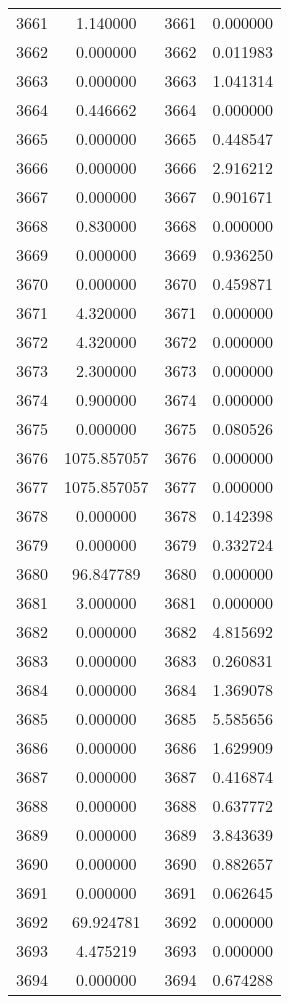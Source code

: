 \documentclass[12pt]{article}
\begin{document}
\begin{longtable}{@{}cccc@{}}
3661 & 1.140000 & 3661 & 0.000000 \\
3662 & 0.000000 & 3662 & 0.011983 \\
3663 & 0.000000 & 3663 & 1.041314 \\
3664 & 0.446662 & 3664 & 0.000000 \\
3665 & 0.000000 & 3665 & 0.448547 \\
3666 & 0.000000 & 3666 & 2.916212 \\
3667 & 0.000000 & 3667 & 0.901671 \\
3668 & 0.830000 & 3668 & 0.000000 \\
3669 & 0.000000 & 3669 & 0.936250 \\
3670 & 0.000000 & 3670 & 0.459871 \\
3671 & 4.320000 & 3671 & 0.000000 \\
3672 & 4.320000 & 3672 & 0.000000 \\
3673 & 2.300000 & 3673 & 0.000000 \\
3674 & 0.900000 & 3674 & 0.000000 \\
3675 & 0.000000 & 3675 & 0.080526 \\
3676 & 1075.857057 & 3676 & 0.000000 \\
3677 & 1075.857057 & 3677 & 0.000000 \\
3678 & 0.000000 & 3678 & 0.142398 \\
3679 & 0.000000 & 3679 & 0.332724 \\
3680 & 96.847789 & 3680 & 0.000000 \\
3681 & 3.000000 & 3681 & 0.000000 \\
3682 & 0.000000 & 3682 & 4.815692 \\
3683 & 0.000000 & 3683 & 0.260831 \\
3684 & 0.000000 & 3684 & 1.369078 \\
3685 & 0.000000 & 3685 & 5.585656 \\
3686 & 0.000000 & 3686 & 1.629909 \\
3687 & 0.000000 & 3687 & 0.416874 \\
3688 & 0.000000 & 3688 & 0.637772 \\
3689 & 0.000000 & 3689 & 3.843639 \\
3690 & 0.000000 & 3690 & 0.882657 \\
3691 & 0.000000 & 3691 & 0.062645 \\
3692 & 69.924781 & 3692 & 0.000000 \\
3693 & 4.475219 & 3693 & 0.000000 \\
3694 & 0.000000 & 3694 & 0.674288 \\

\end{longtable}
\end{document}
